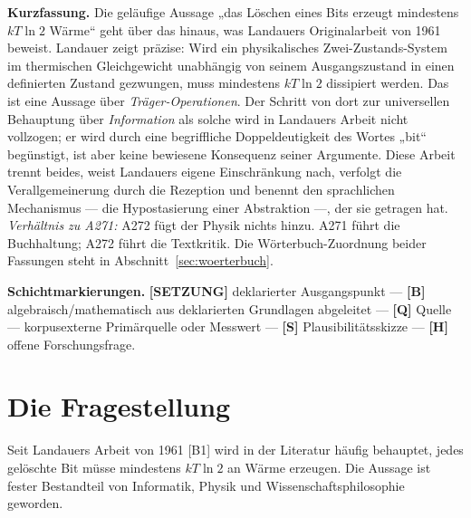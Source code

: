 
\providecommand{\qedsq}{\raisebox{0.03em}{\framebox[0.62em]{\rule{0pt}{0.42em}}}}
\begingroup\small\noindent
\textbf{Kurzfassung.} Die geläufige Aussage „das Löschen eines Bits erzeugt
mindestens $kT\ln 2$ Wärme“ geht über das hinaus, was Landauers Originalarbeit von
1961 beweist. Landauer zeigt präzise: Wird ein physikalisches
Zwei-Zustands-System im thermischen Gleichgewicht unabhängig von seinem
Ausgangszustand in einen definierten Zustand gezwungen, muss mindestens
$kT\ln 2$ dissipiert werden. Das ist eine Aussage über \emph{Träger-Operationen}.
Der Schritt von dort zur universellen Behauptung über \emph{Information} als
solche wird in Landauers Arbeit nicht vollzogen; er wird durch eine begriffliche
Doppeldeutigkeit des Wortes „bit“ begünstigt, ist aber keine bewiesene Konsequenz
seiner Argumente. Diese Arbeit trennt beides, weist Landauers eigene
Einschränkung nach, verfolgt die Verallgemeinerung durch die Rezeption und
benennt den sprachlichen Mechanismus --- die Hypostasierung einer Abstraktion ---,
der sie getragen hat. \emph{Verhältnis zu A271:} A272 fügt der Physik nichts hinzu.
A271 führt die Buchhaltung; A272 führt die Textkritik. Die Wörterbuch-Zuordnung
beider Fassungen steht in Abschnitt~\ref{sec:woerterbuch}.
\par\endgroup

\bigskip

\begingroup\small\noindent
\textbf{Schichtmarkierungen.} \textbf{[SETZUNG]} deklarierter Ausgangspunkt ---
\textbf{[B]} algebraisch/mathematisch aus deklarierten Grundlagen abgeleitet ---
\textbf{[Q]} Quelle --- korpusexterne Primärquelle oder Messwert ---
\textbf{[S]} Plausibilitätsskizze ---
\textbf{[H]} offene Forschungsfrage.

\par\endgroup

\bigskip

\section{Die Fragestellung}

Seit Landauers Arbeit von 1961 [B1] wird in der Literatur häufig behauptet, jedes
gelöschte Bit müsse mindestens $kT\ln 2$ an Wärme erzeugen. Die Aussage ist fester
Bestandteil von Informatik, Physik und Wissenschaftsphilosophie geworden.

